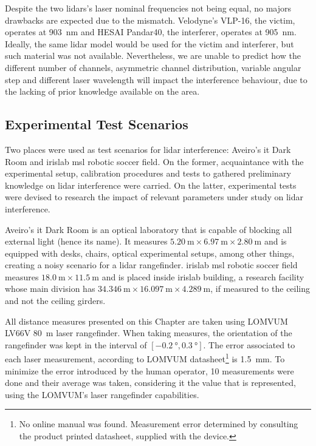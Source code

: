 Despite the two \acp{lidar}'s laser nominal frequencies not being equal, no majors drawbacks are expected due to the mismatch. Velodyne's VLP-16, the victim, operates at \SI{903}{\nano\meter} and HESAI Pandar40, the interferer, operates at \SI{905}{\nano\meter}. Ideally, the same \ac{lidar} model would be used for the victim and interferer, but such material was not available. Nevertheless, we are unable to predict how the different number of channels, asymmetric channel distribution, variable angular step and different laser wavelength will impact the interference behaviour, due to the lacking of prior knowledge available on the area.

\subsection{Experimental Test Scenarios}
\label{subsec:lidar-interference:test-scenarios}

Two places were used as test scenarios for \ac{lidar} interference: Aveiro's \ac{it} Dark Room and \ac{irislab} \ac{msl} robotic soccer field. On the former, acquaintance with the experimental setup, calibration procedures and tests to gathered preliminary knowledge on \ac{lidar} interference were carried. On the latter, experimental tests were devised to research the impact of relevant parameters under study on \ac{lidar} interference. 

Aveiro's \ac{it} Dark Room is an optical laboratory that is capable of blocking all external light (hence its name). It measures $\SI{5.20}{\meter} \times \SI{6.97}{\meter} \times \SI{2.80}{\meter}$ and is equipped with desks, chairs, optical experimental setups, among other things, creating a noisy scenario for a \ac{lidar} rangefinder. 
\ac{irislab} \ac{msl} robotic soccer field measures $\SI{18.0}{\meter} \times \SI{11.5}{\meter}$ and is placed inside \ac{irislab} building, a research facility whose main division has $\SI{34.346}{\meter} \times \SI{16.097}{\meter} \times \SI{4.289}{\meter}$, if measured to the ceiling and not the ceiling girders. 

All distance measures presented on this Chapter are taken using LOMVUM LV66V \SI{80}{\meter} laser rangefinder. When taking measures, the orientation of the rangefinder was kept in the interval of $[\SI{-0.2}{\degree}, \SI{0.3}{\degree}]$. The error associated to each laser measurement, according to LOMVUM datasheet\footnote{No online manual was found. Measurement error determined by consulting the product printed datasheet, supplied with the device.} is \SI{1.5}{\milli\meter}. To minimize the error introduced by the human operator, 10 measurements were done and their average was taken, considering it the value that is represented, using the LOMVUM's laser rangefinder capabilities.


